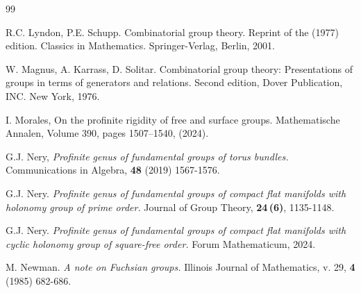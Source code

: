 \documentclass[a4paper,12pt]{article}
\begin{document}
{\begin{thebibliography}{99}

 R.C. Lyndon, P.E. Schupp. Combinatorial group theory. Reprint of the (1977) edition. Classics in Mathematics. Springer-Verlag, Berlin, 2001.

 W. Magnus, A. Karrass, D. Solitar. Combinatorial group theory: Presentations of groups in terms of generators and relations. Second edition, Dover Publication, INC. New York, 1976.

 I.  Morales, On the profinite rigidity of free and surface groups. Mathematische Annalen, Volume 390, pages 1507–1540, (2024).


 G.J. Nery, \textit{Profinite genus of fundamental groups of torus bundles.} Communications in Algebra, \textbf{48} (2019) 1567-1576.

 G.J. Nery. {\it Profinite genus of fundamental groups of compact flat manifolds with holonomy group of prime order.} Journal of Group Theory, \textbf{24\,(6)}, 1135-1148. 

 G.J. Nery. {\it Profinite genus of fundamental groups of compact flat manifolds with cyclic holonomy group of square-free order.} Forum Mathematicum, 2024. 





 M. Newman. {\it A note on Fuchsian groups.} Illinois Journal of Mathematics, v. 29, {\bf 
 4} (1985) 682-686.


\end{thebibliography}}
\end{document}
